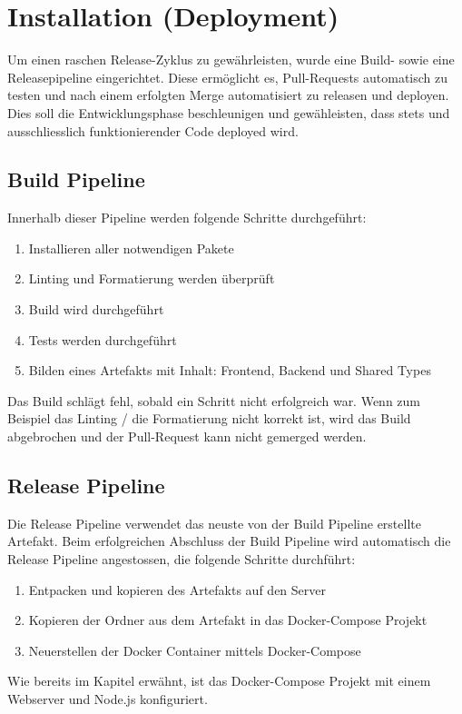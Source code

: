 \documentclass[11pt,a4paper]{scrartcl}
\let\oldsection\section
\renewcommand\section{\clearpage\oldsection}
\begin{document}
\section{Installation (Deployment)}

Um einen raschen Release-Zyklus zu gewährleisten, wurde eine Build- sowie eine Releasepipeline eingerichtet.
Diese ermöglicht es, Pull-Requests automatisch zu testen und nach einem erfolgten Merge automatisiert zu releasen und deployen.
Dies soll die Entwicklungsphase beschleunigen und gewähleisten, dass stets und ausschliesslich funktionierender Code deployed wird.

\subsection{Build Pipeline}
Innerhalb dieser Pipeline werden folgende Schritte durchgeführt:
\begin{enumerate}
  \item Installieren aller notwendigen Pakete
  \item Linting und Formatierung werden überprüft
  \item Build wird durchgeführt
  \item Tests werden durchgeführt
  \item Bilden eines Artefakts mit Inhalt: Frontend, Backend und Shared Types
\end{enumerate}
Das Build schlägt fehl, sobald ein Schritt nicht erfolgreich war. Wenn zum Beispiel das Linting / die Formatierung nicht korrekt ist, wird das Build abgebrochen und der Pull-Request kann nicht gemerged werden.

\subsection{Release Pipeline}
Die Release Pipeline verwendet das neuste von der Build Pipeline erstellte Artefakt. Beim erfolgreichen Abschluss der Build Pipeline wird automatisch die Release Pipeline angestossen, die folgende Schritte durchführt:
\begin{enumerate}
  \item Entpacken und kopieren des Artefakts auf den Server
  \item Kopieren der Ordner aus dem Artefakt in das Docker-Compose Projekt
  \item Neuerstellen der Docker Container mittels Docker-Compose
\end{enumerate}

Wie bereits im Kapitel \textit{} erwähnt, ist das Docker-Compose Projekt mit einem Webserver und Node.js konfiguriert.
\end{document}
